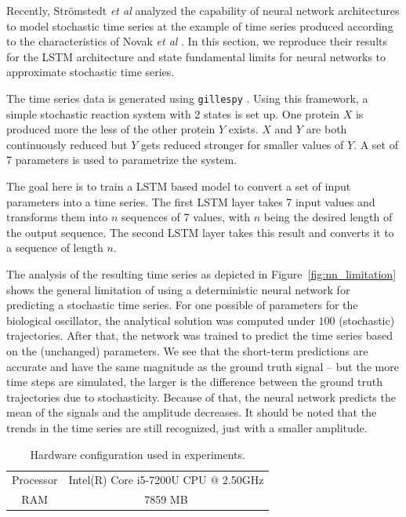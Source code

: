 \documentclass{article}
\begin{document}
Recently, Strömstedt \textit{et al} analyzed the capability of neural network
architectures to model stochastic time series \cite{stroemstedt2018} at the 
example of time series produced according to the characteristics of Novak 
\textit{et al} \cite{novak2008}. In this section, we reproduce their results for
the LSTM architecture and state fundamental limits for neural networks to 
approximate stochastic time series.


The time series data is generated using \texttt{gillespy} \cite{abel2016}.
Using this framework, a simple stochastic reaction system with 2 states is 
set up. One protein $X$ is produced more the less of the other protein $Y$
exists. $X$ and $Y$ are both continuously reduced but $Y$ gets reduced stronger
for smaller values of $Y$. A set of 7 parameters is used to parametrize the 
system.

The goal here is to train a LSTM based 
model to convert a set of input parameters into a time series. The first 
LSTM layer
takes 7 input values and transforms them into $n$ sequences of 7 values, with 
$n$ being the desired length of the output sequence. The second LSTM layer 
takes this result and converts it to a sequence of length $n$. 

The analysis of the resulting time series as depicted in 
Figure~\ref{fig:nn_limitation} shows the general limitation of using a
deterministic neural network for predicting a stochastic time series. For one 
possible of parameters for the biological oscillator, the analytical solution 
was computed under $100$ (stochastic) trajectories. After that, the network was 
trained to predict the time series based on the (unchanged) parameters. We see 
that the short-term predictions are accurate and have the same magnitude as the
ground truth signal -- but the more time steps are simulated, the larger is the
difference between the ground truth trajectories due to stochasticity. Because
of that, the neural network predicts the mean of the signals and the amplitude
decreases. It should be noted that the trends in the time series are still 
recognized, just with a smaller amplitude.

\begin{table}
  \centering
  \begin{tabular}{cc}
    Processor & Intel(R) Core i5-7200U CPU @ 2.50GHz \\
    RAM & 7859 MB \\
  \end{tabular}
  \caption{Hardware configuration used in experiments.}
\end{table}
\end{document}

